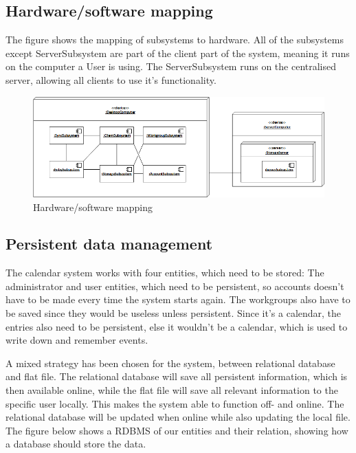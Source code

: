 \pagebreak

\subsection{Hardware/software mapping}
The figure shows the mapping of subsystems to hardware. All of the subsystems except ServerSubsystem are part of the client part of the system, meaning it runs on the computer a User is using. The ServerSubsystem runs on the centralised server, allowing all clients to use it’s functionality.

\begin{figure}[h]
\centering
\includegraphics[scale = 0.7]{deployment}
\caption{Hardware/software mapping}
\end{figure}

\subsection{Persistent data management}

The calendar system works with four entities, which need to be stored: The administrator and user entities, which need to be persistent, so accounts  doesn’t have to be made every time the system starts again. The workgroups also have to be saved since they would be useless unless persistent.
	Since it’s a calendar, the entries also need to be persistent, else it wouldn’t be a calendar, which is used to write down and remember events.

A mixed strategy has been chosen for the system, between relational database and flat file. The relational database will save all persistent information, which is then available online, while the flat file will save all relevant information to the specific user locally.
	This makes the system able to function off- and online. The relational database will be updated when online while also updating the local file. 
\newline \newline \newline
The figure below shows a RDBMS of our entities and their relation, showing how a database should store the data.

